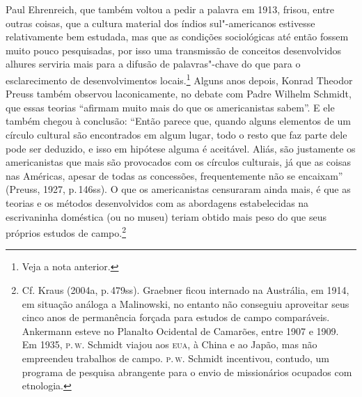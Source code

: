 Paul Ehrenreich, que também voltou a pedir a palavra em 1913, frisou,
entre outras coisas, que a cultura material dos índios sul"-americanos
estivesse relativamente bem estudada, mas que as condições sociológicas
até então fossem muito pouco pesquisadas, por isso uma transmissão de
conceitos desenvolvidos alhures serviria mais para a difusão de
palavras"-chave do que para o esclarecimento de desenvolvimentos
locais.\footnote{Veja a nota anterior.} Alguns anos depois, Konrad
Theodor Preuss também observou laconicamente, no debate com Padre
Wilhelm Schmidt, que essas teorias ``afirmam muito mais do que os
americanistas sabem''. E ele também chegou à conclusão: ``Então parece
que, quando alguns elementos de um círculo cultural são encontrados em
algum lugar, todo o resto que faz parte dele pode ser deduzido, e isso
em hipótese alguma é aceitável. Aliás, são justamente os americanistas
que mais são provocados com os círculos culturais, já que as coisas nas
Américas, apesar de todas as concessões, frequentemente não se
encaixam'' (Preuss, 1927, p.\,146ss). O que os americanistas censuraram
ainda mais, é que as teorias e os métodos desenvolvidos com as
abordagens estabelecidas na escrivaninha doméstica (ou no museu) teriam
obtido mais peso do que seus próprios estudos de campo.\footnote{Cf.
  Kraus (2004a, p.\,479ss). Graebner ficou internado na Austrália, em
  1914, em situação análoga a Malinowski, no entanto não conseguiu
  aproveitar seus cinco anos de permanência forçada para estudos de
  campo comparáveis. Ankermann esteve no Planalto Ocidental de Camarões,
  entre 1907 e 1909. Em 1935, \textsc{p}.\,\textsc{w}. Schmidt viajou aos \textsc{eua}, à China e ao
  Japão, mas não empreendeu trabalhos de campo. \textsc{p}.\,\textsc{w}. Schmidt
  incentivou, contudo, um programa de pesquisa abrangente para o envio
  de missionários ocupados com etnologia.}

